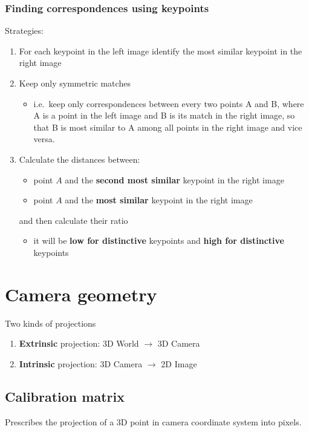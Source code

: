 \documentclass{article}
\begin{document}
    \subsubsection{Finding correspondences using keypoints}
    Strategies:
    \begin{enumerate}
        \item For each keypoint in the left image identify the most similar keypoint in the right image
        \item Keep only symmetric matches
        \begin{itemize}
            \item i.e.\ keep only correspondences between every two points A and B, where A is a point in the left image and B is its match in the right image, so that B is most similar to A among all points in the right image and vice versa.
        \end{itemize}
        \item Calculate the distances between:
        \begin{itemize}
            \item point $A$ and the \textbf{second most similar} keypoint in the right image
            \item point $A$ and the \textbf{most similar} keypoint in the right image 
        \end{itemize}
        and then calculate their ratio
        \begin{itemize}
            \item it will be \textbf{low for distinctive} keypoints and \textbf{high for distinctive} keypoints
        \end{itemize}
    \end{enumerate}

    \newpage

\section{Camera geometry}
Two kinds of projections
\begin{enumerate}
    \item \textbf{Extrinsic} projection: 3D World $\rightarrow$ 3D Camera
    \item \textbf{Intrinsic} projection: 3D Camera $\rightarrow$ 2D Image
\end{enumerate}

    \subsection{Calibration matrix}
    Prescribes the projection of a 3D point in camera coordinate system into pixels.
\end{document}
